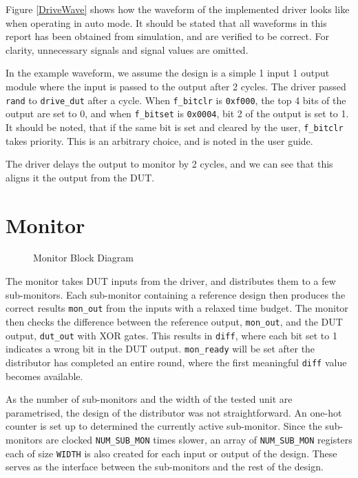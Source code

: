 Figure \ref{DriveWave} shows how the waveform of the implemented driver looks like when operating in auto mode.
It should be stated that all waveforms in this report has been obtained from simulation, and are verified to be correct.
For clarity, unnecessary signals and signal values are omitted.

In the example waveform, we assume the design is a simple 1 input 1 output module where the input is passed to the output after 2 cycles.
The driver passed \texttt{rand} to \texttt{drive\_dut} after a cycle.
When \texttt{f\_bitclr} is \texttt{0xf000}, the top 4 bits of the output are set to 0, and when \texttt{f\_bitset} is \texttt{0x0004}, bit 2 of the output is set to 1.
It should be noted, that if the same bit is set and cleared by the user, \texttt{f\_bitclr} takes priority.
This is an arbitrary choice, and is noted in the user guide.

The driver delays the output to monitor by 2 cycles, and we can see that this aligns it the output from the DUT.

\section{Monitor}
\begin{figure}[H]
  \centering
  
  \caption{Monitor Block Diagram}
  \label{MonitorBlk}
\end{figure}

The monitor takes DUT inputs from the driver, and distributes them to a few sub-monitors.
Each sub-monitor containing a reference design then produces the correct results \texttt{mon\_out} from the inputs with a relaxed time budget.
The monitor then checks the difference between the reference output, \texttt{mon\_out}, and the DUT output, \texttt{dut\_out} with XOR gates.
This results in \texttt{diff}, where each bit set to 1 indicates a wrong bit in the DUT output.
\texttt{mon\_ready} will be set after the distributor has completed an entire round, where the first meaningful \texttt{diff} value becomes available.

As the number of sub-monitors and the width of the tested unit are parametrised, the design of the distributor was not straightforward.
An one-hot counter is set up to determined the currently active sub-monitor.
Since the sub-monitors are clocked \texttt{NUM\_SUB\_MON} times slower, an array of \texttt{NUM\_SUB\_MON} registers each of size \texttt{WIDTH} is also created for each input or output of the design.
These serves as the interface between the sub-monitors and the rest of the design.

